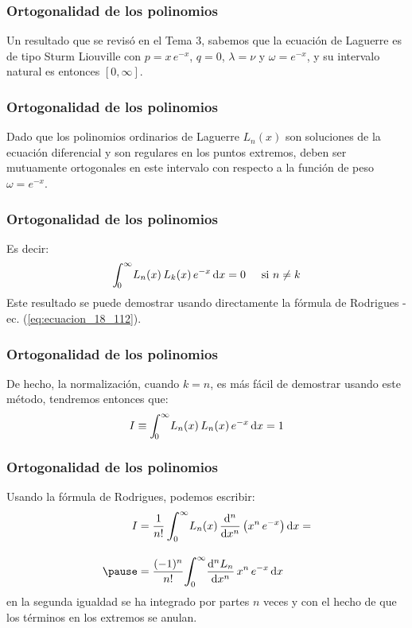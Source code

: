 \documentclass[12pt]{beamer}
\begin{document}
\begin{frame}
\frametitle{Ortogonalidad de los polinomios}
Un resultado que se revisó en el Tema 3, sabemos que la ecuación de Laguerre es de tipo Sturm Liouville con $p = x \, e^{-x}$, $q = 0$, $\lambda = \nu$ y $\omega = e^{-x}$, y su intervalo natural es entonces $[0, \infty]$.
\end{frame}
\begin{frame}
\frametitle{Ortogonalidad de los polinomios}
Dado que los polinomios ordinarios de Laguerre $L_{n} (x)$ son soluciones de la ecuación diferencial y son regulares en los puntos extremos, deben ser mutuamente ortogonales en este intervalo con respecto a la función de peso $\omega = e^{-x}$.
\end{frame}
\begin{frame}
\frametitle{Ortogonalidad de los polinomios}
Es decir:
\pause
\begin{align*}
\scaleint{5ex}_{\bs 0}^{\infty} L_{n}(x) \, L_{k} (x) \, e^{-x} \dd{x} = 0 \hspace{0.5cm} \text{si } n \neq k
\end{align*}
Este resultado se puede demostrar usando directamente la fórmula de Rodrigues - ec. (\ref{eq:ecuacion_18_112}).
\end{frame}
\begin{frame}
\frametitle{Ortogonalidad de los polinomios}
De hecho, la normalización, cuando $k = n$, es más fácil de demostrar usando este método, tendremos entonces que:
\pause
\begin{align}
I \equiv \scaleint{5ex}_{\bs 0}^{\infty} L_{n} (x) \, L_{n} (x) \, e^{-x} \dd{x} = 1
\label{eq:ecuacion_18_113}
\end{align}
\end{frame}
\begin{frame}
\frametitle{Ortogonalidad de los polinomios}
Usando la fórmula de Rodrigues, podemos escribir:
\begin{eqnarray*}
\begin{aligned}
I &= \dfrac{1}{n!} \, \scaleint{6ex}_{\bs 0}^{\infty} L_{n}(x) \, \dv[n]{x} \left( x^{n} \, e^{-x} \right) \dd{x} = \\[1em] \pause
&=\dfrac{(-1)^{n}}{n!} \scaleint{6ex}_{\bs 0}^{\infty} \dv[n]{L_{n}}{x} \, x^{n} \, e^{-x} \dd{x}
\end{aligned}
\end{eqnarray*}
en la segunda igualdad se ha integrado por partes $n$ veces y con el hecho de que los términos en los extremos se anulan.
\end{frame}
\end{document}
